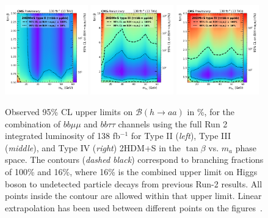 \begin{figure}[h]
    \begin{center}
      \includegraphics[width=0.32\textwidth]{figures/ch-10-results/HAA_comb_II_prelim.pdf}
      \includegraphics[width=0.32\textwidth]{figures/ch-10-results/HAA_comb_III_prelim.pdf}
      \includegraphics[width=0.32\textwidth]{figures/ch-10-results/HAA_comb_IV_prelim.pdf}
    \end{center}
    \caption[Observed 95\% CL upper limits on $\mathcal{B}(h\to aa)$ in \%, for the combination of $bb\mu\mu$ and $bb\tau\tau$ channels using the full Run 2 integrated luminosity of 138 fb$^{-1}$ for Type II (\textit{left}), Type III (\textit{middle}), and Type IV (\textit{right}) 2HDM+S in the $\tan\beta$ vs. $m_a$ phase space.]{Observed 95\% CL upper limits on $\mathcal{B}(h\to aa)$ in \%, for the combination of $bb\mu\mu$ and $bb\tau\tau$ channels using the full Run 2 integrated luminosity of 138 fb$^{-1}$ for Type II (\textit{left}), Type III (\textit{middle}), and Type IV (\textit{right}) 2HDM+S in the $\tan\beta$ vs. $m_a$ phase space. The contours (\textit{dashed black}) correspond to branching fractions of 100\% and 16\%, where 16\% is the combined upper limit on Higgs boson to undetected particle decays from previous Run-2 results. All points inside the contour are allowed within that upper limit. Linear extrapolation has been used between different points on the figures~\cite{CMS-AN-20-213}.}
      \label{fig:results_limits_combined_2D}
  \end{figure}
  
